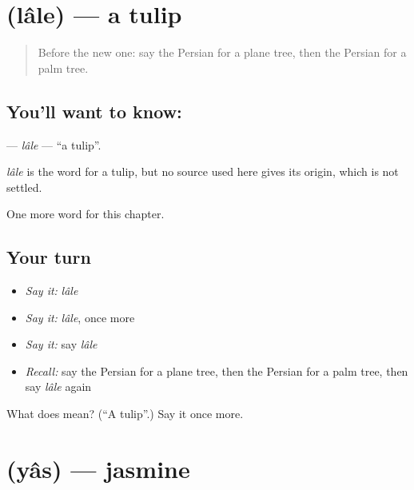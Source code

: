 \section[\texorpdfstring{\fa{لاله} (lâle)}{لاله (lâle)}]{ (lâle) — a tulip}

\label{lesson:FA-C279-lale}



\begin{quote}
Before the new one: say the Persian for a plane tree, then the Persian for a palm tree.
\end{quote}

\subsection*{You'll want to know: }
\textbf{} — \emph{lâle} — \textquotedblleft{}a tulip\textquotedblright{}.

\begin{cousinweb}
\emph{lâle} is the word for a tulip, but no source used here gives its origin, which is not settled.
\end{cousinweb}

\begin{grammarlens}[title={What you've built}]
One more word for this chapter.
\end{grammarlens}

\subsection*{Your turn}
\begin{itemize}
\raggedright
  \item \emph{Say it:} \emph{lâle}
  \item \emph{Say it:} \emph{lâle}, once more
  \item \emph{Say it:} say \emph{lâle}
  \item \emph{Recall:} say the Persian for a plane tree, then the Persian for a palm tree, then say \emph{lâle} again
\end{itemize}

\begin{tcolorbox}[breakable,colback=teal!4,colframe=teal!35!black,title={Before you move on}]
What does  mean? (\textquotedblleft{}A tulip\textquotedblright{}.) Say it once more.
\end{tcolorbox}
\section[\texorpdfstring{\fa{یاس} (yâs)}{یاس (yâs)}]{ (yâs) — jasmine}

